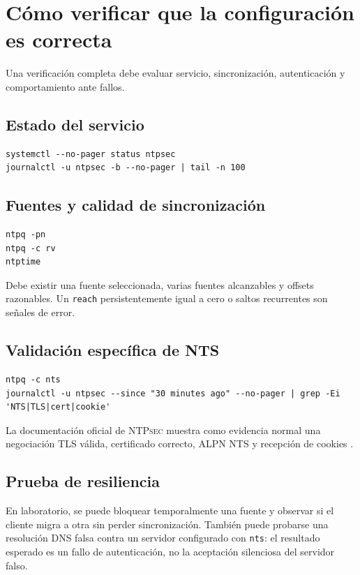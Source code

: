 \documentclass[11pt,a4paper]{article}
\newcommand{\ntpsec}{\textsc{NTPsec}}
\begin{document}
\section{Cómo verificar que la configuración es correcta}

Una verificación completa debe evaluar servicio, sincronización, autenticación y comportamiento ante fallos.

\subsection{Estado del servicio}

\begin{lstlisting}[style=terminal]
systemctl --no-pager status ntpsec
journalctl -u ntpsec -b --no-pager | tail -n 100
\end{lstlisting}

\subsection{Fuentes y calidad de sincronización}

\begin{lstlisting}[style=terminal]
ntpq -pn
ntpq -c rv
ntptime
\end{lstlisting}

Debe existir una fuente seleccionada, varias fuentes alcanzables y offsets razonables. Un \texttt{reach} persistentemente igual a cero o saltos recurrentes son señales de error.

\subsection{Validación específica de NTS}

\begin{lstlisting}[style=terminal]
ntpq -c nts
journalctl -u ntpsec --since "30 minutes ago" --no-pager | grep -Ei 'NTS|TLS|cert|cookie'
\end{lstlisting}

La documentación oficial de \ntpsec{} muestra como evidencia normal una negociación TLS válida, certificado correcto, ALPN NTS y recepción de cookies \cite{ntpsecnts}.

\subsection{Prueba de resiliencia}

En laboratorio, se puede bloquear temporalmente una fuente y observar si el cliente migra a otra sin perder sincronización. También puede probarse una resolución DNS falsa contra un servidor configurado con \texttt{nts}: el resultado esperado es un fallo de autenticación, no la aceptación silenciosa del servidor falso.
\end{document}
